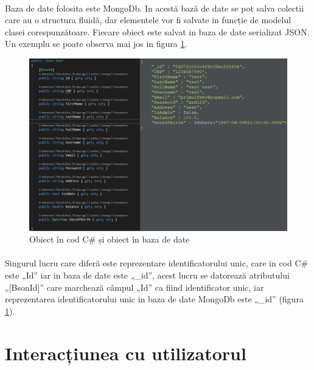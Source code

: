 \documentclass[12pt]{report}
\begin{document}
  	\paragraph{}Baza de date folosita este MongoDb. In acestă bază de date se pot salva colectii care au o structura fluidă, dar elementele vor fi salvate in funcție de modelul clasei corespunzătoare. Fiecare obiect este salvat in baza de date serializat JSON. Un exemplu se poate observa mai jos in figura \ref{dbEx}.
  	\begin{figure}[h]
  	\centering
  	\includegraphics[scale=0.81]{dbEx}
	\caption{Obiect în cod C\# și obiect în baza de date}  
	\label{dbEx}
  	\end{figure}
  	\paragraph{}Singurul lucru care diferă este reprezentare identificatorului unic, care in cod C\# este „Id” iar in baza de date este „\_id”, acest lucru se datorează atributului „[BsonId]” care marchează câmpul „Id” ca fiind identificator unic, iar reprezentarea identificatorului unic in baza de date MongoDb este „\_id” (figura \ref{dbEx}).
	\section{Interacțiunea cu utilizatorul}
\end{document}
